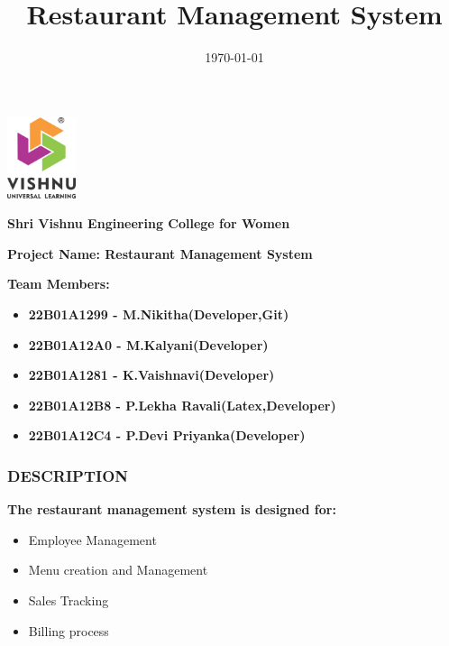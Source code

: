 \documentclass{beamer}
\title{Restaurant Management System}
\institute{SVECW}
\date{\today}
\begin{document}
\begin{frame}
  \begin{center}
    \includegraphics[width=2cm]{logo.png}
  \end{center}

  \begin{center}
    \textbf{\large \colorbox{yellow!20}{Shri Vishnu Engineering College for Women}}
  \end{center}

  \begin{center}
    \textbf{\large\colorbox{purple!20}{Project Name: Restaurant Management System}}
  \end{center}

  \begin{flushleft}
    \textbf{\large\colorbox{blue!20}{Team Members:}}
  \end{flushleft}

  \begin{itemize}
          \item{\small\textbf {22B01A1299 - M.Nikitha(Developer,Git)}}
          \item{\small\textbf {22B01A12A0 - M.Kalyani(Developer)}}
           \item{\small\textbf {22B01A1281 - K.Vaishnavi(Developer)}}
          \item{\small\textbf {22B01A12B8 - P.Lekha Ravali(Latex,Developer)}}
          \item{\small\textbf {22B01A12C4 - P.Devi Priyanka(Developer)}}
  \end{itemize}
\end{frame}

\begin{frame}
  \frametitle{DESCRIPTION}


\textbf{\large {The restaurant management system is designed for:}}
      \begin{itemize}
    \item Employee Management
     \item Menu creation and Management
      \item Sales Tracking
      \item Billing process
  \end{itemize}
\end{frame}
\end{document}
